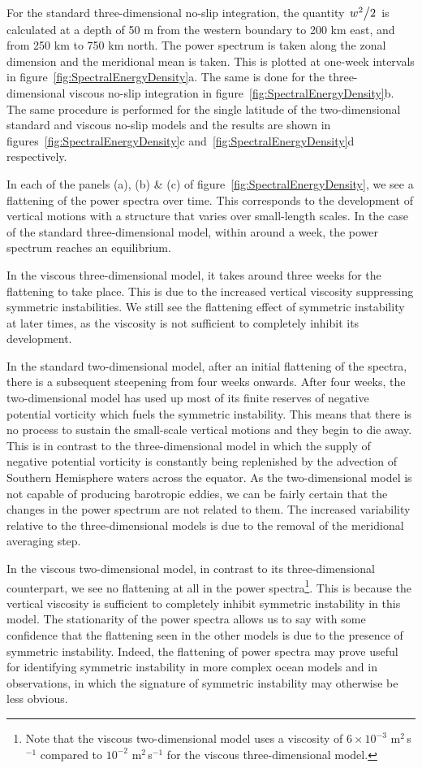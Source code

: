 For the standard three-dimensional no-slip integration, the quantity $\flatfrac{w^2}{2}$ is calculated at a depth of 50 m from the western boundary to 200 km east, and from 250 km to 750 km north. The power spectrum is taken along the zonal dimension and the meridional mean is taken. This is plotted at one-week intervals in figure~\ref{fig:SpectralEnergyDensity}a. The same is done for the three-dimensional viscous no-slip integration in figure~\ref{fig:SpectralEnergyDensity}b. The same procedure is performed for the single latitude of the two-dimensional standard and viscous no-slip models and the results are shown in figures~\ref{fig:SpectralEnergyDensity}c and~\ref{fig:SpectralEnergyDensity}d respectively.

In each of the panels (a), (b) \& (c) of figure~\ref{fig:SpectralEnergyDensity}, we see a flattening of the power spectra over time. This corresponds to the development of vertical motions with a structure that varies over small-length scales. In the case of the standard three-dimensional model, within around a week, the power spectrum reaches an equilibrium.

In the viscous three-dimensional model, it takes around three weeks for the flattening to take place. This is due to the increased vertical viscosity suppressing symmetric instabilities. We still see the flattening effect of symmetric instability at later times, as the viscosity is not sufficient to completely inhibit its development.

In the standard two-dimensional model, after an initial flattening of the spectra, there is a subsequent steepening from four weeks onwards. After four weeks, the two-dimensional model has used up most of its finite reserves of negative potential vorticity which fuels the symmetric instability. This means that there is no process to sustain the small-scale vertical motions and they begin to die away. This is in contrast to the three-dimensional model in which the supply of negative potential vorticity is constantly being replenished by the advection of Southern Hemisphere waters across the equator. As the two-dimensional model is not capable of producing barotropic eddies, we can be fairly certain that the changes in the power spectrum are not related to them. The increased variability relative to the three-dimensional models is due to the removal of the meridional averaging step.

In the viscous two-dimensional model, in contrast to its three-dimensional counterpart, we see no flattening at all in the power spectra\footnote{Note that the viscous two-dimensional model uses a viscosity of $6 \times 10^{-3}$ m$^2$\,s$^{-1}$ compared to $10^{-2}$ m$^2$\,s$^{-1}$ for the viscous three-dimensional model.}. This is because the vertical viscosity is sufficient to completely inhibit symmetric instability in this model. The stationarity of the power spectra allows us to say with some confidence that the flattening seen in the other models is due to the presence of symmetric instability. Indeed, the flattening of power spectra may prove useful for identifying symmetric instability in more complex ocean models and in observations, in which the signature of symmetric instability may otherwise be less obvious.

